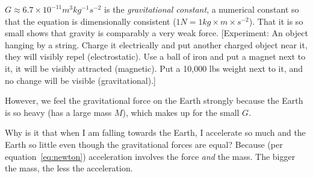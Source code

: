 \documentclass[pagesize,headsepline,10pt,parskip=half,BCOR=12mm]{scrreprt}
\begin{document}
        $G \approx 6.7 \times 10^{-11} m^3 kg^{-1} s^{-2}$ is the
        \emph{gravitational constant}, a numerical constant so that
        the equation is dimensionally consistent ($1 N = 1 kg
        \times m \times s^{-2}$).
        That it is so small shows that gravity is comparably a very
        weak force.
        [Experiment: An object hanging by a string. Charge it
        electrically and put another charged object near it, they
        will visibly repel (electrostatic). Use a ball of iron and
        put a magnet next to it, it will be visibly attracted
        (magnetic). Put a 10,000 lbs weight next to it, and no
        change will be visible (gravitational).]

        However, we feel the gravitational force on the Earth
        strongly because the Earth is so heavy (has a large mass
        $M$), which makes up for the small $G$.

        Why is it that when I am falling towards the Earth, I
        accelerate so much and the Earth so little even though the
        gravitational forces are equal? Because (per equation~\ref{eq:newton}) acceleration involves the force \emph{and}
        the mass.  The bigger the mass, the less the acceleration.
\end{document}
